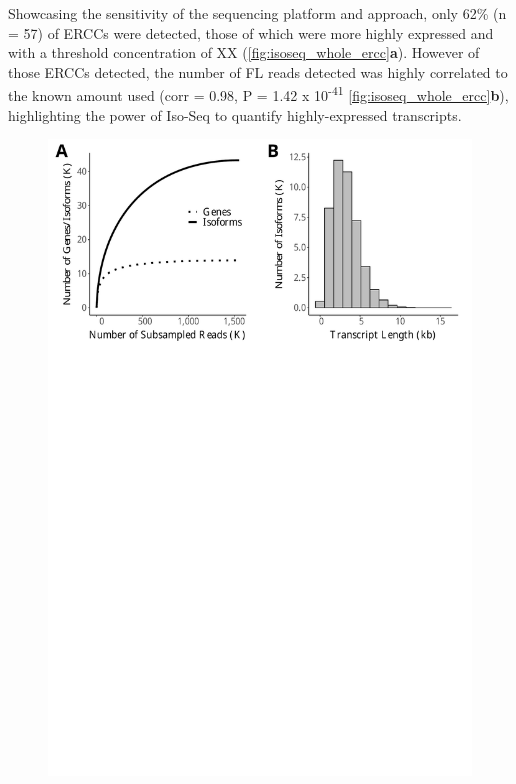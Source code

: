 Showcasing the sensitivity of the sequencing platform and approach, only 62\% (n = 57) of ERCCs were detected, those of which were more highly expressed and with a threshold concentration of XX (\cref{fig:isoseq_whole_ercc}\textbf{a}). However of those ERCCs detected, the number of FL reads detected was highly correlated to the known amount used (corr = 0.98, P = 1.42 x 10\textsuperscript{-41} \cref{fig:isoseq_whole_ercc}\textbf{b}), highlighting the power of Iso-Seq to quantify highly-expressed transcripts. 

\begin{figure}[htp]
	\begin{center}
		\includegraphics[page=11,trim={0 1cm 0 0},clip,scale = 0.55]{Figures/IsoSeqWholeTranscriptome.pdf}
	\end{center}

\end{figure}
